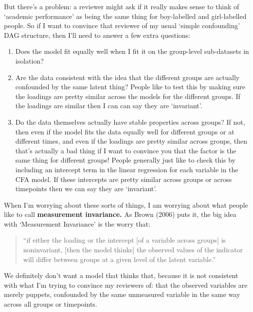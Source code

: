 \documentclass[
  letterpaper,
  DIV=11,
  numbers=noendperiod]{scrreprt}
\providecommand{\tightlist}{%
  \setlength{\itemsep}{0pt}\setlength{\parskip}{0pt}}\usepackage{longtable,booktabs,array}
\begin{document}
But there's a problem: a reviewer might ask if it really makes sense to
think of `academic performance' as being the same thing for boy-labelled
and girl-labelled people. So if I want to convince that reviewer of my
usual `simple confounding' DAG structure, then I'll need to answer a few
extra questions:

\begin{enumerate}
\def\labelenumi{\arabic{enumi}.}
\tightlist
\item
  Does the model fit equally well when I fit it on the group-level
  sub-datasets in isolation?
\item
  Are the data consistent with the idea that the different groups are
  actually confounded by the same latent thing? People like to test this
  by making sure the loadings are pretty similar across the models for
  the different groups. If the loadings are similar then I can can say
  they are `invariant'.
\item
  Do the data themselves actually have stable properties across groups?
  If not, then even if the model fits the data equally well for
  different groups or at different times, and even if the loadings are
  pretty similar across groups, then that's actually a bad thing if I
  want to convince you that the factor is the same thing for different
  groups! People generally just like to check this by including an
  intercept term in the linear regression for each variable in the CFA
  model. If these intercepts are pretty similar across groups or across
  timepoints then we can say they are `invariant'.
\end{enumerate}

When I'm worrying about these sorts of things, I am worrying about what
people like to call \textbf{measurement invariance.} As Brown (2006)
puts it, the big idea with `Measurement Invariance' is the worry that:

\begin{quote}
``if either the loading or the intercept {[}of a variable across
groups{]} is noninvariant, {[}then the model thinks{]} the observed
values of the indicator will differ between groups at a given level of
the latent variable.''
\end{quote}

We definitely don't want a model that thinks that, because it is not
consistent with what I'm trying to convince my reviewers of: that the
observed variables are merely puppets, confounded by the same unmeasured
variable in the same way across all groups or timepoints.
\end{document}
